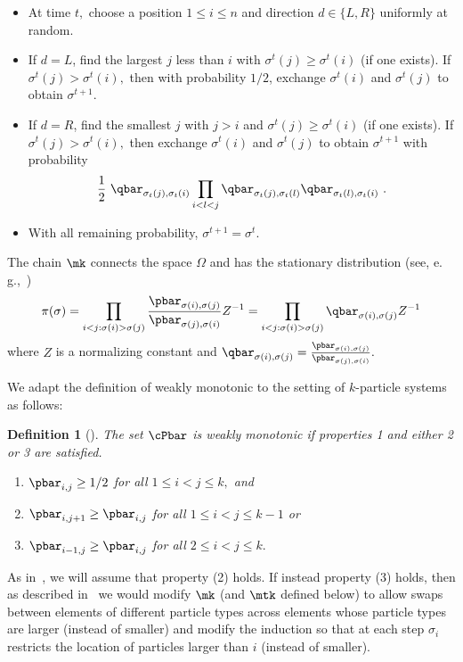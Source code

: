 \documentclass[11pt]{article}
\newtheorem{definition}[theorem]{Definition}
\providecommand{\eg}{e.\,g.}
\begin{document}
\vspace{.1in}

\vspace{.05in}
\begin{itemize}
\item At time $t,$ choose a position $1\leq i \leq n$ and direction 
$d \in \{L, R\}$ uniformly at random.  
\item If $d = L$, find the largest $j$ less than $i$ with $\sigma^t(j) \geq \sigma^t(i)$ (if one exists).  If $\sigma^t(j) > \sigma^t(i),$ then 
with probability $1/2$,
exchange $\sigma^t(i)$ and $\sigma^t(j)$ to obtain $\sigma^{t+1}.$  
\item If $d = R$, find the smallest $j$ with  $j>i$ and $\sigma^t(j) \geq \sigma^t(i)$ (if one exists).  If $\sigma^t(j) > \sigma^t(i),$ then exchange $\sigma^t(i)$ and $\sigma^t(j)$ to obtain $\sigma^{t+1}$ with probability 
$$\frac{1}{2}~ \qbar_{\sigma_t(j),\sigma_t(i)}  \prod_{i<l<j} \qbar_{\sigma_t(j),\sigma_t(l)}\qbar_{\sigma_t(l),\sigma_t(i)}\,\,.$$


\item With all remaining probability, $\sigma^{t+1} = \sigma^t$.
\end{itemize}

\noindent The chain $\mk$  connects the space $\Omega$ and has the stationary distribution (see, \eg,~\cite{bmrs})
$$\pi(\sigma) = \prod_{i < j: \sigma(i) > \sigma(j)}\frac{\pbar_{\sigma(i),\sigma(j)}}{\pbar_{\sigma(j),\sigma(i)}} Z^{-1} = \prod_{i < j: \sigma(i) > \sigma(j)}\qbar_{\sigma(i), \sigma(j)} Z^{-1} $$ where $Z$ is a normalizing constant and $\qbar_{\sigma(i), \sigma(j)}=\frac{\pbar_{\sigma(i),\sigma(j)}}{\pbar_{\sigma(j),\sigma(i)}}.$  

We adapt the definition of weakly monotonic to the setting of $k$-particle systems as follows:
 
\begin{definition}[\cite{bmrs}]\label{mono}The set $\cPbar$ is weakly monotonic if properties 1 and either 2 or 3 are satisfied.
\begin{enumerate}
\item $\pbar_{i,j} \geq 1/2$ for all $1 \leq i < j \leq k,$ and
\item $\pbar_{i,j+1} \geq \pbar_{i,j}$ for all $1 \leq i < j \leq k-1$ or
\item $\pbar_{i-1,j} \geq \pbar_{i,j}$ for all $2 \leq i < j \leq k.$
\end{enumerate}
\end{definition}
\noindent As in~\cite{MS}, we will assume that property (2) holds.  If
instead property (3) holds, then as described in~\cite{MS} we would
modify $\mk$ (and $\mtk$ defined below) to allow swaps between
elements of different particle types across elements whose particle
types are larger (instead of smaller) and modify the induction so
that at each step $\sigma_{i}$ restricts the location of particles
larger than $i$ (instead of smaller).
\end{document}
